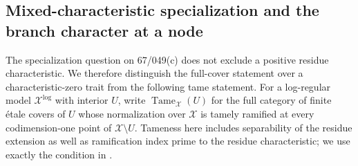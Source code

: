 \subsection{Mixed-characteristic specialization and the branch character at a node}

The specialization question on 67/049(c) does not exclude a positive
residue characteristic. We therefore distinguish the full-cover statement
over a characteristic-zero trait from the following tame statement.
For a log-regular model $\mathcal X^{\log}$ with interior $U$, write
$\operatorname{Tame}_{\mathcal X}(U)$ for the full category of finite
\'etale covers of $U$ whose normalization over $\mathcal X$ is tamely
ramified at every codimension-one point of
$\mathcal X\setminus U$. Tameness here includes separability of the
residue extension as well as ramification index prime to the residue
characteristic; we use exactly the condition in
\cite[Proposition~A.10, pp.~57--58]{HoshiLog2009A567}.

